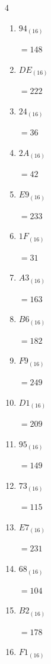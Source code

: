 \begin{multicols}{4}
\begin{enumerate}
        $=96$

  \item $94_{(16)}$

        $=148$

  \item $DE_{(16)}$

        $=222$

\columnbreak %

\resetques

  \item $24_{(16)}$

        $=36$

  \item $2A_{(16)}$

        $=42$

  \item $E9_{(16)}$

        $=233$

  \item $1F_{(16)}$

        $=31$

  \item $A3_{(16)}$

        $=163$

  \item $B6_{(16)}$

        $=182$

  \item $F9_{(16)}$

        $=249$

  \item $D1_{(16)}$

        $=209$

  \item $95_{(16)}$

        $=149$

  \item $73_{(16)}$

        $=115$

  \item $E7_{(16)}$

        $=231$

  \item $68_{(16)}$

        $=104$

  \item $B2_{(16)}$

        $=178$

  \item $F1_{(16)}$


\end{enumerate}
\end{multicols}
